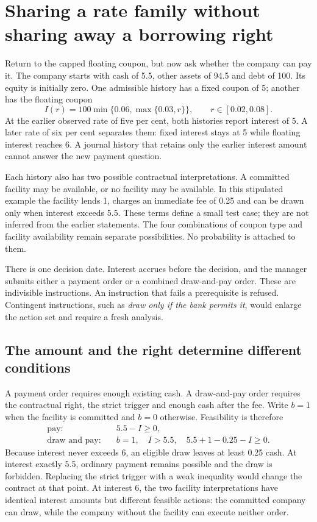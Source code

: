 \section{Sharing a rate family without sharing away a borrowing right}
\label{sim:continuous-guard-reference}

Return to the capped floating coupon, but now ask whether the company can pay it. The company starts with cash of 5.5, other assets of 94.5 and debt of 100. Its equity is initially zero. One admissible history has a fixed coupon of 5; another has the floating coupon
\begin{equation}
 I(r)=100\min\{0.06,\max\{0.03,r\}\},
 \qquad r\in[0.02,0.08].
\end{equation}
At the earlier observed rate of five per cent, both histories report interest of 5. A later rate of six per cent separates them: fixed interest stays at 5 while floating interest reaches 6. A journal history that retains only the earlier interest amount cannot answer the new payment question.

Each history also has two possible contractual interpretations. A committed facility may be available, or no facility may be available. In this stipulated example the facility lends 1, charges an immediate fee of 0.25 and can be drawn only when interest exceeds 5.5. These terms define a small test case; they are not inferred from the earlier statements. The four combinations of coupon type and facility availability remain separate possibilities. No probability is attached to them.

There is one decision date. Interest accrues before the decision, and the manager submits either a payment order or a combined draw-and-pay order. These are indivisible instructions. An instruction that fails a prerequisite is refused. Contingent instructions, such as \emph{draw only if the bank permits it}, would enlarge the action set and require a fresh analysis.

\subsection{The amount and the right determine different conditions}

A payment order requires enough existing cash. A draw-and-pay order requires the contractual right, the strict trigger and enough cash after the fee. Write $b=1$ when the facility is committed and $b=0$ otherwise. Feasibility is therefore
\begin{align}
 \text{pay:}\quad &5.5-I\geq0,\\
 \text{draw and pay:}\quad &b=1,\quad I>5.5,
                    \quad 5.5+1-0.25-I\geq0.
\end{align}
Because interest never exceeds 6, an eligible draw leaves at least 0.25 cash. At interest exactly 5.5, ordinary payment remains possible and the draw is forbidden. Replacing the strict trigger with a weak inequality would change the contract at that point. At interest 6, the two facility interpretations have identical interest amounts but different feasible actions: the committed company can draw, while the company without the facility can execute neither order.

